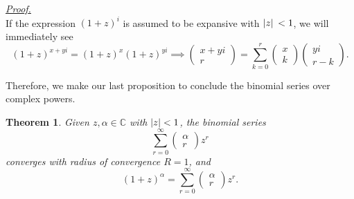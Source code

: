 \documentclass[12pt]{article}
\newtheorem*{theorem}{Theorem}
\renewenvironment{proof}[1][Proof]{\begin{snugshade*} \underline{\textit{{#1}.}}\\}{\hfill \qedsymbol \end{snugshade*}}
\begin{document}
    \begin{proof}
        If the expression $(1+z)^i$ is assumed to be expansive with $\abs*{z}<1$, we will immediately see \[(1+z)^{x+yi}=(1+z)^x(1+z)^{yi}\implies \begin{pmatrix}
            x+yi\\r
        \end{pmatrix}=\sum_{k=0}^{r}\begin{pmatrix}
            x\\k
        \end{pmatrix}\begin{pmatrix}
            yi\\r-k
        \end{pmatrix}.\]
    \end{proof}

    Therefore, we make our last proposition to conclude the binomial series over complex powers.

    \begin{theorem}
        Given $z,\alpha \in\mathbb{C}$ with $\abs{z}<1$, the binomial series \[\sum_{r=0}^{\infty}\begin{pmatrix}
            \alpha\\r
        \end{pmatrix}z^r\] converges with radius of convergence $R=1$, and \[(1+z)^\alpha=\sum_{r=0}^{\infty}\begin{pmatrix}
            \alpha\\r
        \end{pmatrix}z^r.\]
    \end{theorem}
\end{document}
